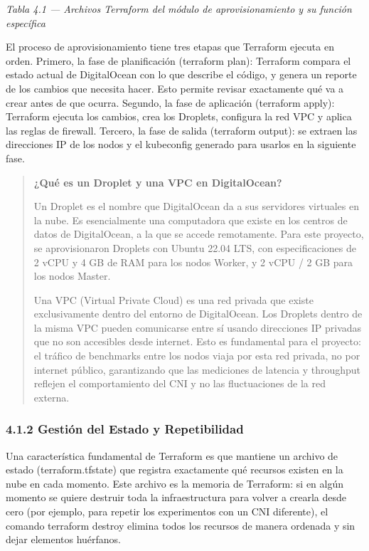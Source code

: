 \documentclass[journal]{IEEEtran}
\begin{document}
\begin{center}\emph{\emph{Tabla 4.1 --- Archivos Terraform del módulo de aprovisionamiento y su función específica}}\end{center}

El proceso de aprovisionamiento tiene tres etapas que Terraform ejecuta en orden. Primero, la fase de planificación (terraform plan): Terraform compara el estado actual de DigitalOcean con lo que describe el código, y genera un reporte de los cambios que necesita hacer. Esto permite revisar exactamente qué va a crear antes de que ocurra. Segundo, la fase de aplicación (terraform apply): Terraform ejecuta los cambios, crea los Droplets, configura la red VPC y aplica las reglas de firewall. Tercero, la fase de salida (terraform output): se extraen las direcciones IP de los nodos y el kubeconfig generado para usarlos en la siguiente fase.

\begin{quote}
\textbf{¿Qué es un Droplet y una VPC en DigitalOcean?}

Un Droplet es el nombre que DigitalOcean da a sus servidores virtuales en la nube. Es esencialmente una computadora que existe en los centros de datos de DigitalOcean, a la que se accede remotamente. Para este proyecto, se aprovisionaron Droplets con Ubuntu 22.04 LTS, con especificaciones de 2 vCPU y 4 GB de RAM para los nodos Worker, y 2 vCPU / 2 GB para los nodos Master.

Una VPC (Virtual Private Cloud) es una red privada que existe exclusivamente dentro del entorno de DigitalOcean. Los Droplets dentro de la misma VPC pueden comunicarse entre sí usando direcciones IP privadas que no son accesibles desde internet. Esto es fundamental para el proyecto: el tráfico de benchmarks entre los nodos viaja por esta red privada, no por internet público, garantizando que las mediciones de latencia y throughput reflejen el comportamiento del CNI y no las fluctuaciones de la red externa.
\end{quote}

\subsubsection{4.1.2 Gestión del Estado y Repetibilidad}

Una característica fundamental de Terraform es que mantiene un archivo de estado (terraform.tfstate) que registra exactamente qué recursos existen en la nube en cada momento. Este archivo es la memoria de Terraform: si en algún momento se quiere destruir toda la infraestructura para volver a crearla desde cero (por ejemplo, para repetir los experimentos con un CNI diferente), el comando terraform destroy elimina todos los recursos de manera ordenada y sin dejar elementos huérfanos.
\end{document}
